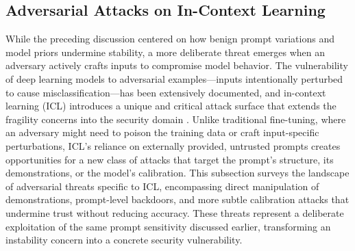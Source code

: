 \documentclass[11pt]{article}
\begin{document}
\subsection{Adversarial Attacks on In-Context Learning}

While the preceding discussion centered on how benign prompt variations and model priors undermine stability, a more deliberate threat emerges when an adversary actively crafts inputs to compromise model behavior. The vulnerability of deep learning models to adversarial examples---inputs intentionally perturbed to cause misclassification---has been extensively documented, and in-context learning (ICL) introduces a unique and critical attack surface that extends the fragility concerns into the security domain \cite{ref426,ref427}. Unlike traditional fine-tuning, where an adversary might need to poison the training data or craft input-specific perturbations, ICL's reliance on externally provided, untrusted prompts creates opportunities for a new class of attacks that target the prompt's structure, its demonstrations, or the model's calibration. This subsection surveys the landscape of adversarial threats specific to ICL, encompassing direct manipulation of demonstrations, prompt-level backdoors, and more subtle calibration attacks that undermine trust without reducing accuracy. These threats represent a deliberate exploitation of the same prompt sensitivity discussed earlier, transforming an instability concern into a concrete security vulnerability.
\end{document}
